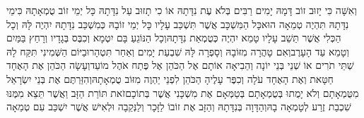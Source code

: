\documentclass[../main/main.tex]{subfiles}
\begin{document}
\begin{multicols*}{\ncols}
וְאִשָּׁה כִּי יָזוּב זוֹב דָּמָהּ יָמִים רַבִּים בְּלֹא עֶת נִדָּתָהּ אוֹ כִי תָזוּב עַל נִדָּתָהּ כָּל יְמֵי זוֹב טֻמְאָתָהּ כִּימֵי נִדָּתָהּ תִּהְיֶה טְמֵאָה הוּא\PreVerseSpace{}כָּל הַמִּשְׁכָּב אֲשֶׁר תִּשְׁכַּב עָלָיו כָּל יְמֵי זוֹבָהּ כְּמִשְׁכַּב נִדָּתָהּ יִהְיֶה לָּהּ וְכָל הַכְּלִי אֲשֶׁר תֵּשֵׁב עָלָיו טָמֵא יִהְיֶה כְּטֻמְאַת נִדָּתָהּ\PreVerseSpace{}וְכָל הַנּוֹגֵעַ בָּם יִטְמָא וְכִבֶּס בְּגָדָיו וְרָחַץ בַּמַּיִם וְטָמֵא עַד הָעָרֶב\PreVerseSpace{}וְאִם טָהֲרָה מִזּוֹבָהּ וְסָפְרָה לָּהּ שִׁבְעַת יָמִים וְאַחַר תִּטְהָר\PreVerseSpace{}וּבַיּוֹם הַשְּׁמִינִי תִּקַּח לָהּ שְׁתֵּי תֹרִים אוֹ שְׁנֵי בְּנֵי יוֹנָה וְהֵבִיאָה אוֹתָם אֶל הַכֹּהֵן אֶל פֶּתַח אֹהֶל מוֹעֵד\PreVerseSpace{}וְעָשָׂה הַכֹּהֵן אֶת הָאֶחָד חַטָּאת וְאֶת הָאֶחָד עֹלָה וְכִפֶּר עָלֶיהָ הַכֹּהֵן לִפְנֵי יַהְוֶה מִזּוֹב טֻמְאָתָהּ\PreVerseSpace{}וְהִזַּרְתֶּם אֶת בְּנֵי יִשְׂרָאֵל מִטֻּמְאָתָם וְלֹא יָמֻתוּ בְּטֻמְאָתָם בְּטַמְּאָם אֶת מִשְׁכָּנִי אֲשֶׁר בְּתוֹכָם\PreVerseSpace{}זֹאת תּוֹרַת הַזָּב וַאֲשֶׁר תֵּצֵא מִמֶּנּוּ שִׁכְבַת זֶרַע לְטָמְאָה בָהּ\PreVerseSpace{}וְהַדָּוָה בְּנִדָּתָהּ וְהַזָּב אֶת זוֹבוֹ לַזָּכָר וְלַנְּקֵבָה וּלְאִישׁ אֲשֶׁר יִשְׁכַּב עִם טְמֵאָה\OpenSection{}\par

\end{multicols*}
\end{document}
